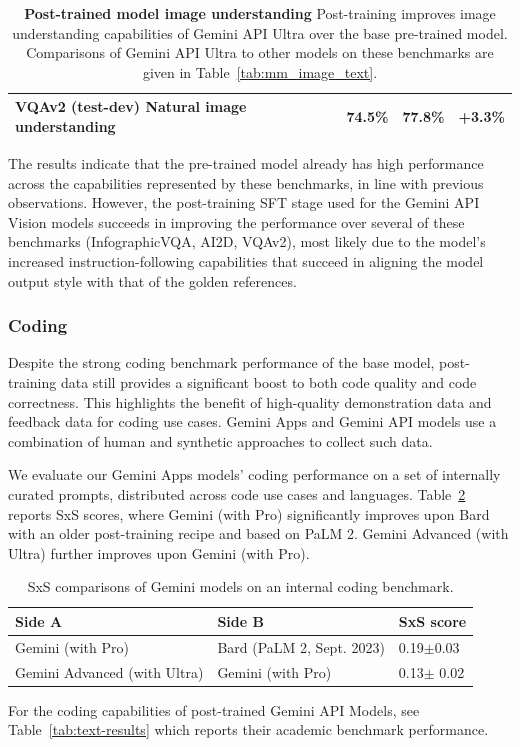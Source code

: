 \begin{table}[ht!]
\begin{tabular}{p{3.5cm}p{2cm}p{2cm}p{2.3cm}}
\addlinespace[1ex]
\textbf{VQAv2 (test-dev)} \newline \tiny{Natural image understanding \newline\citep{vqav2}} & 74.5\% &  77.8\% & +3.3\% \\
\bottomrule
\end{tabular}
\caption{\textbf{Post-trained model image understanding} Post-training improves image understanding capabilities of Gemini API Ultra over the base pre-trained model. Comparisons of Gemini API Ultra to other models on these benchmarks are given in Table~\ref{tab:mm_image_text}.
\label{tab:posttraining_mm_image_text}
}
\vspace{-0.1cm}
\end{table}

The results indicate that the pre-trained model already has high performance across the capabilities represented by these benchmarks, in line with previous observations. However, the post-training SFT stage used for the Gemini API Vision models succeeds in improving the performance over several of these benchmarks (InfographicVQA, AI2D, VQAv2), most likely due to the model’s increased instruction-following capabilities that succeed in aligning the model output style with that of the golden references.

\subsubsection{Coding}

Despite the strong coding benchmark performance of the base model, post-training data still provides a significant boost to both code quality and code correctness. This highlights the benefit of high-quality demonstration data and feedback data for coding use cases. Gemini Apps and Gemini API models use a combination of human and synthetic approaches to collect such data.

We evaluate our Gemini Apps models’ coding performance on a set of internally curated prompts, distributed across code use cases and languages. Table~\ref{tab:posttrain-coding} reports SxS scores, where Gemini (with Pro) significantly improves upon Bard with an older post-training recipe and based on PaLM 2. Gemini Advanced (with Ultra) further improves upon Gemini (with Pro). 


\begin{table}[ht!]
    \centering
    \scriptsize
    \begin{tabular}{p{4cm}p{4cm}|l}
    \toprule
    Side A & Side B & SxS score \\
    \midrule
    Gemini (with Pro) & Bard (PaLM 2, Sept. 2023) & 0.19$\pm$0.03 \\
    Gemini Advanced (with Ultra) & Gemini (with Pro) & 0.13$\pm$ 0.02 \\
    \bottomrule
    \end{tabular}
    \caption{SxS comparisons of Gemini models on an internal coding benchmark.}
    \label{tab:posttrain-coding}
\end{table}

For the coding capabilities of post-trained Gemini API Models, see Table~\ref{tab:text-results} which reports their academic benchmark performance.
